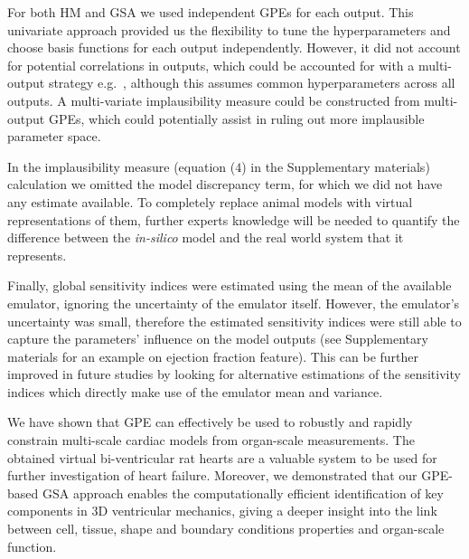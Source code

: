 For both HM and GSA we used independent GPEs for each output. This univariate approach provided us the flexibility to tune the hyperparameters and choose basis functions for each output independently. However, it did not account for potential correlations in outputs, which could be accounted for with a multi-output strategy e.g.~\cite{Conti:2009}, although this assumes common hyperparameters across all outputs. A multi-variate implausibility measure could be constructed from multi-output GPEs, which could potentially assist in ruling out more implausible parameter space.

In the implausibility measure (equation ($4$) in the Supplementary materials) calculation we omitted the model discrepancy term, for which we did not have any estimate available. To completely replace animal models with virtual representations of them, further experts knowledge will be needed to quantify the difference between the \textit{in-silico} model and the real world system that it represents. 

Finally, global sensitivity indices were estimated using the mean of the available emulator, ignoring the uncertainty of the emulator itself. However, the emulator's uncertainty was small, therefore the estimated sensitivity indices were still able to capture the parameters' influence on the model outputs (see Supplementary materials for an example on ejection fraction feature). This can be further improved in future studies by looking for alternative estimations of the sensitivity indices which directly make use of the emulator mean and variance.

\vspace{0.2cm}\noindent
{}

\noindent
We have shown that GPE can effectively be used to robustly and rapidly constrain multi-scale cardiac models from organ-scale measurements. The obtained virtual bi-ventricular rat hearts are a valuable system to be used for further investigation of heart failure. Moreover, we demonstrated that our GPE-based GSA approach enables the computationally efficient identification of key components in 3D ventricular mechanics, giving a deeper insight into the link between cell, tissue, shape and boundary conditions properties and organ-scale function.